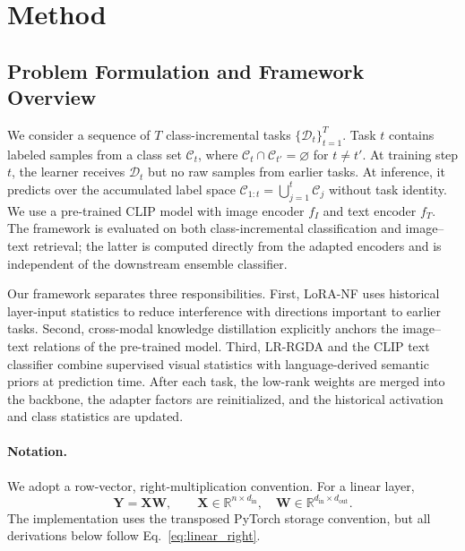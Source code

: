 \section{Method}
\label{sec:method}

\subsection{Problem Formulation and Framework Overview}
\label{sec:problem}

We consider a sequence of $T$ class-incremental tasks $\{\mathcal{D}_t\}_{t=1}^{T}$. Task $t$ contains labeled samples from a class set $\mathcal{C}_t$, where $\mathcal{C}_t\cap\mathcal{C}_{t'}=\varnothing$ for $t\neq t'$. At training step $t$, the learner receives $\mathcal{D}_t$ but no raw samples from earlier tasks. At inference, it predicts over the accumulated label space $\mathcal{C}_{1:t}=\bigcup_{j=1}^{t}\mathcal{C}_j$ without task identity. We use a pre-trained CLIP model with image encoder $f_I$ and text encoder $f_T$. The framework is evaluated on both class-incremental classification and image--text retrieval; the latter is computed directly from the adapted encoders and is independent of the downstream ensemble classifier.

Our framework separates three responsibilities. First, LoRA-NF uses historical layer-input statistics to reduce interference with directions important to earlier tasks. Second, cross-modal knowledge distillation explicitly anchors the image--text relations of the pre-trained model. Third, LR-RGDA and the CLIP text classifier combine supervised visual statistics with language-derived semantic priors at prediction time. After each task, the low-rank weights are merged into the backbone, the adapter factors are reinitialized, and the historical activation and class statistics are updated.

\paragraph{Notation.}
We adopt a row-vector, right-multiplication convention. For a linear layer,
\begin{equation}
    \mathbf{Y}=\mathbf{X}\mathbf{W},
    \qquad
    \mathbf{X}\in\mathbb{R}^{n\times d_{\mathrm{in}}},
    \quad
    \mathbf{W}\in\mathbb{R}^{d_{\mathrm{in}}\times d_{\mathrm{out}}}.
    \label{eq:linear_right}
\end{equation}
The implementation uses the transposed PyTorch storage convention, but all derivations below follow Eq.~\eqref{eq:linear_right}.

